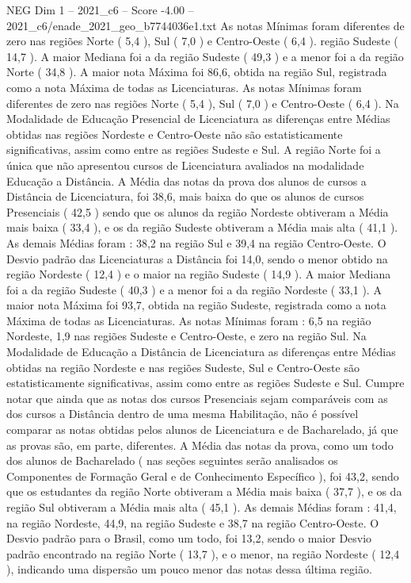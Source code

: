 \begin{textsample}{NEG Dim 1 – 2021\_c6 – Score -4.00 – 2021\_c6/enade\_2021\_geo\_b7744036e1.txt}
As notas Mínimas foram diferentes de zero nas regiões Norte ( 5,4 ), Sul ( 7,0 ) e Centro-Oeste ( 6,4 ). região Sudeste ( 14,7 ).
A maior Mediana foi a da região Sudeste ( 49,3 ) e a menor foi a da região Norte ( 34,8 ).
A maior nota Máxima foi 86,6, obtida na região Sul, registrada como a nota Máxima de todas as Licenciaturas.
As notas Mínimas foram diferentes de zero nas regiões Norte ( 5,4 ), Sul ( 7,0 ) e Centro-Oeste ( 6,4 ).
Na Modalidade de Educação Presencial de Licenciatura as diferenças entre Médias obtidas nas regiões Nordeste e Centro-Oeste não são estatisticamente significativas, assim como entre as regiões Sudeste e Sul.
A região Norte foi a única que não apresentou cursos de Licenciatura avaliados na modalidade Educação a Distância.
A Média das notas da prova dos alunos de cursos a Distância de Licenciatura, foi 38,6, mais baixa do que os alunos de cursos Presenciais ( 42,5 ) sendo que os alunos da região Nordeste obtiveram a Média mais baixa ( 33,4 ), e os da região Sudeste obtiveram a Média mais alta ( 41,1 ).
As demais Médias foram : 38,2 na região Sul e 39,4 na região Centro-Oeste.
O Desvio padrão das Licenciaturas a Distância foi 14,0, sendo o menor obtido na região Nordeste ( 12,4 ) e o maior na região Sudeste ( 14,9 ).
A maior Mediana foi a da região Sudeste ( 40,3 ) e a menor foi a da região Nordeste ( 33,1 ).
A maior nota Máxima foi 93,7, obtida na região Sudeste, registrada como a nota Máxima de todas as Licenciaturas.
As notas Mínimas foram : 6,5 na região Nordeste, 1,9 nas regiões Sudeste e Centro-Oeste, e zero na região Sul.
Na Modalidade de Educação a Distância de Licenciatura as diferenças entre Médias obtidas na região Nordeste e nas regiões Sudeste, Sul e Centro-Oeste são estatisticamente significativas, assim como entre as regiões Sudeste e Sul.
Cumpre notar que ainda que as notas dos cursos Presenciais sejam comparáveis com as dos cursos a Distância dentro de uma mesma Habilitação, não é possível comparar as notas obtidas pelos alunos de Licenciatura e de Bacharelado, já que as provas são, em parte, diferentes.
A Média das notas da prova, como um todo dos alunos de Bacharelado ( nas seções seguintes serão analisados os Componentes de Formação Geral e de Conhecimento Específico ), foi 43,2, sendo que os estudantes da região Norte obtiveram a Média mais baixa ( 37,7 ), e os da região Sul obtiveram a Média mais alta ( 45,1 ).
As demais Médias foram : 41,4, na região Nordeste, 44,9, na região Sudeste e 38,7 na região Centro-Oeste.
O Desvio padrão para o Brasil, como um todo, foi 13,2, sendo o maior Desvio padrão encontrado na região Norte ( 13,7 ), e o menor, na região Nordeste ( 12,4 ), indicando uma dispersão um pouco menor das notas dessa última região.

\end{textsample}
